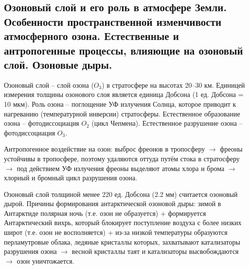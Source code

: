 \subsection{Озоновый слой и его роль в атмосфере Земли. Особенности пространственной изменчивости атмосферного озона. Естественные и антропогенные процессы, влияющие на озоновый слой. Озоновые дыры.}
Озоновый слой -- слой озона ($O_3$) в стратосфере на высотах  20--30 км.
Единицей измерения толщины озонового слоя является единица Добсона (1 ед. Добсона = 10 мкм).
Роль озона -- поглощение УФ излучения Солнца, которое приводит к нагреванию (температурной инверсии) стратосферы.
Естественное образование озона -- фотодиссоциация $O_2$ (цикл Чепмена).
Естественное разрушение озона -- фотодиссоциация $O_3$.

Антропогенное воздействие на озон: выброс фреонов в тропосферу $\rightarrow$ фреоны устойчивы в тропосфере, поэтому удаляются оттуда путём стока в стратосферу $\rightarrow$ под действием УФ излучения фреоны выделяют атомы хлора и брома $\rightarrow$ хлорный и бромный цикл разрушения озона.

Озоновый слой толщиной менее 220 ед. Добсона (2.2 мм) считается озоновый дырой.
Причины формирования антарктической озоновой дыры: зимой в Антарктиде полярная ночь (т.е. озон не образуется) + формируется Антарктический вихрь, который блокирует поступление воздуха с более низких широт (т.е. озон не восполняется) + из-за низкой температуры образуются перламутровые облака, ледяные кристаллы которых, захватывают катализаторы разрушения озона $\rightarrow$ весной кристаллы таят и катализаторы высвобождаются $\rightarrow$ озон уничтожается.
